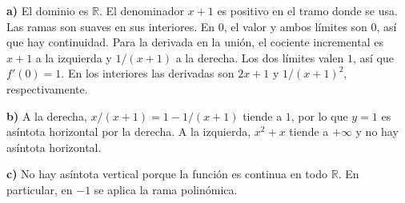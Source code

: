 \textbf{a)} El dominio es $\mathbb R$. El denominador $x+1$ es positivo en el tramo donde se usa. Las ramas son suaves en sus interiores. En $0$, el valor y ambos límites son $0$, así que hay continuidad. Para la derivada en la unión, el cociente incremental es $x+1$ a la izquierda y $1/(x+1)$ a la derecha. Los dos límites valen $1$, así que $f'(0)=1$. En los interiores las derivadas son $2x+1$ y $1/(x+1)^2$, respectivamente.

\textbf{b)} A la derecha, $x/(x+1)=1-1/(x+1)$ tiende a $1$, por lo que $\boxed{y=1}$ es asíntota horizontal por la derecha. A la izquierda, $x^2+x$ tiende a $+\infty$ y no hay asíntota horizontal.

\textbf{c)} No hay asíntota vertical porque la función es continua en todo $\mathbb R$. En particular, en $-1$ se aplica la rama polinómica.
